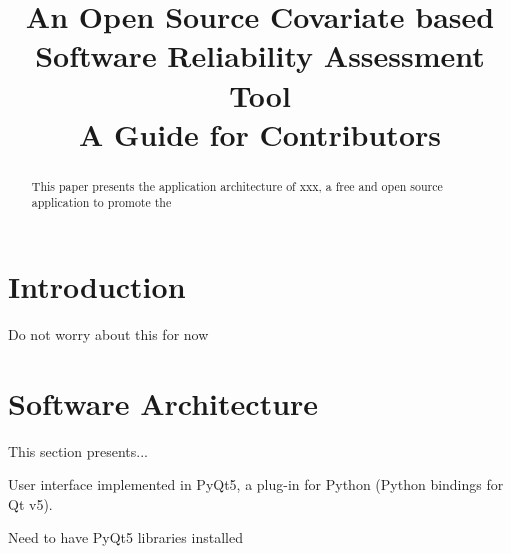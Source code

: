 \documentclass[conference]{IEEEtran}
\begin{document}
\title{An Open Source Covariate based Software Reliability Assessment Tool \\
	 A Guide for Contributors}

\author{
}

\maketitle

\begin{abstract}%
This paper presents the application architecture of xxx, a free and open source application to promote the
\end{abstract}



\section{Introduction}\label{sec:Intro}
Do not worry about this for now



\section{Software Architecture}\label{sec:Architecture}
This section presents...

User interface implemented in PyQt5, a plug-in for Python (Python bindings for Qt v5).

Need to have PyQt5 libraries installed
\end{document}

